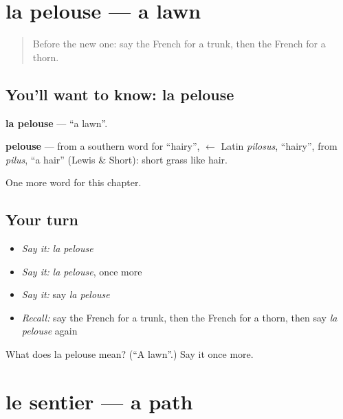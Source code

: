 \section[la pelouse]{la pelouse — a lawn}

\label{lesson:FR-C254-pelouse}



\begin{quote}
Before the new one: say the French for a trunk, then the French for a thorn.
\end{quote}

\subsection*{You'll want to know: la pelouse}
\textbf{la pelouse} — \textquotedblleft{}a lawn\textquotedblright{}.

\begin{cousinweb}
\textbf{pelouse} — from a southern word for \textquotedblleft{}hairy\textquotedblright{}, $\leftarrow$ Latin \emph{pilosus}, \textquotedblleft{}hairy\textquotedblright{}, from \emph{pilus}, \textquotedblleft{}a hair\textquotedblright{} (Lewis \& Short): short grass like hair.
\end{cousinweb}

\begin{grammarlens}[title={What you've built}]
One more word for this chapter.
\end{grammarlens}

\subsection*{Your turn}
\begin{itemize}
\raggedright
  \item \emph{Say it:} \emph{la pelouse}
  \item \emph{Say it:} \emph{la pelouse}, once more
  \item \emph{Say it:} say \emph{la pelouse}
  \item \emph{Recall:} say the French for a trunk, then the French for a thorn, then say \emph{la pelouse} again
\end{itemize}

\begin{tcolorbox}[breakable,colback=teal!4,colframe=teal!35!black,title={Before you move on}]
What does la pelouse mean? (\textquotedblleft{}A lawn\textquotedblright{}.) Say it once more.
\end{tcolorbox}
\section[le sentier]{le sentier — a path}

